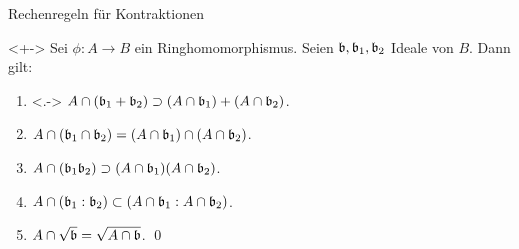\begin{frame}{Rechenregeln für Kontraktionen}
	\begin{proposition}<+->
		Sei \(\phi\colon A \to B\) ein Ringhomomorphismus. Seien \(\mathfrak{b},
		\mathfrak{b}_1, \mathfrak{b}_2\) Ideale von \(B\). Dann gilt:
		\begin{enumerate}[<+->]
		\item<.->
		    \(A \cap (\mathfrak{b}_1 + \mathfrak{b}_2) \supset (A \cap \mathfrak{b}_1)
		    + (A \cap \mathfrak{b}_2)\).
		\item
		    \(A \cap (\mathfrak{b}_1 \cap \mathfrak{b}_2) = (A \cap \mathfrak{b}_1) \cap
		    (A \cap \mathfrak{b}_2)\).
		\item   
		    \(A \cap (\mathfrak{b}_1 \mathfrak{b}_2) \supset (A \cap \mathfrak{b}_1)
		    (A \cap \mathfrak{b}_2)\).
		\item
		    \(A \cap (\mathfrak{b}_1 : \mathfrak{b}_2) \subset (A \cap \mathfrak{b}_1 :
		    A \cap \mathfrak{b}_2)\).
		\item
		    \(A \cap \sqrt{\mathfrak{b}} = \sqrt{A \cap \mathfrak{b}}\).
		    \qed
		\end{enumerate}
	\end{proposition}
\end{frame}

